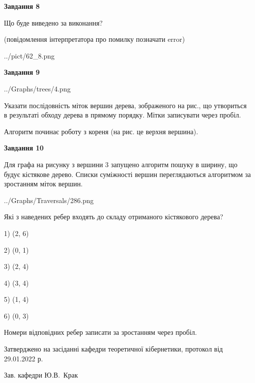 \documentclass[12pt, ukrainian]{article}
\begin{document}
{\begin {large}
{\begin {center}\textbf{Завдання 8}\end {center}}\par
Що буде виведено за виконання?\par
 (повідомлення інтерпретатора про помилку позначати error)\par
\begin{center}
	{../pict/62_8.png}
\end{center}
\newpage

{\begin {center}\textbf{Завдання 9}\end {center}}\par

\begin{center}
	{../Graphs/trees/4.png}
\end{center}
Указати послідовність міток вершин дерева, зображеного на рис., що утвориться в результаті обходу дерева в прямому порядку. Мітки записувати через пробіл.\par Алгоритм починає роботу з кореня (на рис. це верхня вершина).\par
\newpage

{\begin {center}\textbf{Завдання 10}\end {center}}\par
Для графа на рисунку з вершини 3 запущено алгоритм пошуку в ширину, що будує кістякове дерево. Списки суміжності вершин переглядаються алгоритмом за зростанням міток вершин.\par
\begin{center}
	{../Graphs/Traversals/286.png}
\end{center}
\par Які з наведених ребер входять до складу отриманого кістякового дерева?\par
1) (2, 6)\par
2) (0, 1)\par
3) (2, 4)\par
4) (3, 4)\par
5) (1, 4)\par
6) (0, 3)\par
{\vskip 15pt} Номери відповідних ребер записати за зростанням через пробіл.\par
\newpage


\end {large}
}
{\smallskip \begin {small} Затверджено на засіданні кафедри теоретичної кібернетики, протокол  від   29.01.2022 р.\par\smallskip\smallskip
{\parbox {6.5 cm}{Зав. кафедри \dotfill Ю.В.~Крак}} \end{small}}
\end{document}

